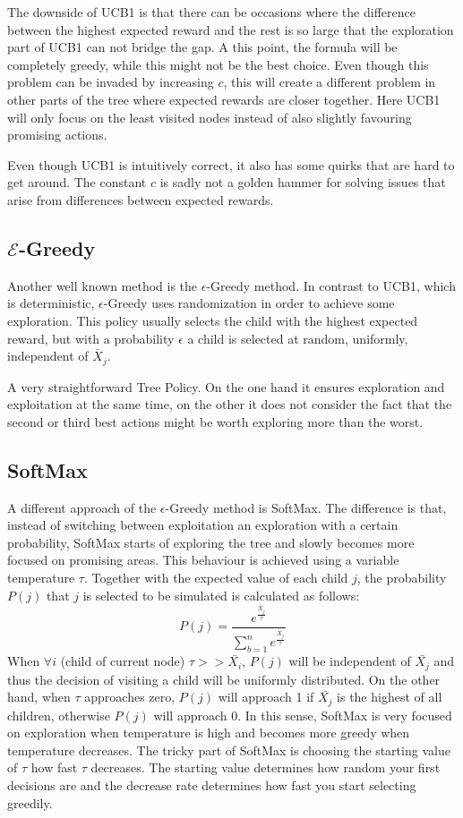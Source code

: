 The downside of UCB1 is that there can be occasions where the difference between the highest expected reward and the rest is so large that the exploration part of UCB1 can not bridge the gap. A this point, the formula will be completely greedy, while this might not be the best choice. Even though this problem can be invaded by increasing $c$, this will create a different problem in other parts of the tree where expected rewards are closer together. Here UCB1 will only focus on the least visited nodes instead of also slightly favouring promising actions.

Even though UCB1 is intuitively correct, it also has some quirks that are hard to get around. The constant $c$ is sadly not a golden hammer for solving issues that arise from differences between expected rewards. 

\subsection{$\mathcal{E}$-Greedy}

Another well known method is the $\epsilon$-Greedy method\cite{barto1998reinforcement}. In contrast to UCB1, which is deterministic, $\epsilon$-Greedy uses randomization in order to achieve some exploration. This policy usually selects the child with the highest expected reward, but with a probability $\epsilon$ a child is selected at random, uniformly, independent of $\bar{X}_j$.

A very straightforward Tree Policy. On the one hand it ensures exploration and exploitation at the same time, on the other it does not consider the fact that the second or third best actions might be worth exploring more than the worst. 

\subsection{SoftMax}
A different approach of the $\epsilon$-Greedy method is SoftMax\cite{barto1998reinforcement}. The difference is that, instead of switching between exploitation an exploration with a certain probability, SoftMax starts of exploring the tree and slowly becomes more focused on promising areas. This behaviour is achieved using a variable temperature $\tau$. Together with the expected value of each child $j$, the probability $P(j)$ that $j$ is selected to be simulated is calculated as follows:  
\begin{equation}
P(j) = \frac{e^\frac{\bar{X}_j}{\tau}}{\sum_{b=1}^{n} e^\frac{\bar{X}_j}{\tau}}
\end{equation}
When $\forall i$ (child of current node) $\tau >> \bar{X_i}$, $P(j)$ will be independent of $\bar{X_j}$ and thus the decision of visiting a child will be uniformly distributed. On the other hand, when $\tau$ approaches zero, $P(j)$ will approach 1 if $\bar{X_j}$ is the highest of all children, otherwise $P(j)$ will approach 0. In this sense, SoftMax is very focused on exploration when temperature is high and becomes more greedy when temperature decreases. The tricky part of SoftMax is choosing the starting value of $\tau$ how fast $\tau$ decreases. The starting value determines how random your first decisions are and the decrease rate determines how fast you start selecting greedily. 


